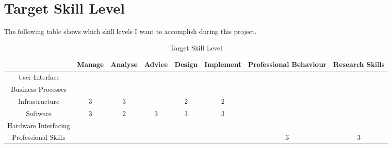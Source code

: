
\section{Target Skill Level}
\label{sec:target}

The following table shows which skill levels I want to accomplish during this project.

\begin{table}[H]
	\centering
	\begin{tabular}{|c|c|c|c|c|c|c|c|}
		\hline
		& Manage & Analyse & Advice & Design & Implement & Professional Behaviour & Research Skills \\ \hline
		User-Interface & & & & & & & \\ \hline
		Business Processes & & & & & & & \\ \hline
		Infrastructure & \cellcolor[HTML]{FD6864}3 & \cellcolor[HTML]{FD6864}3 & & 2 & 2 & & \\ \hline
		Software & \cellcolor[HTML]{FD6864}3 & 2 & \cellcolor[HTML]{FD6864}3 & \cellcolor[HTML]{FD6864}3 & 3 & & \\ \hline
		Hardware Interfacing & & & & & & & \\ \hline
		Professional Skills & & & & & & \cellcolor[HTML]{FD6864}3 & 3 \\ \hline             
	\end{tabular}
	\caption{Target Skill Level}
	\label{targetskills}
\end{table}

